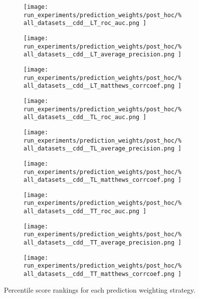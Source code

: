 \documentclass[conference]{IEEEtran}
\begin{document}
\begin{figure*}
    \centering
    \begin{subfigure}{0.32\textwidth}
        \texttt{[image: 
            run\_experiments/prediction\_weights/post\_hoc/\%
            all\_datasets\_\_cdd\_\_LT\_roc\_auc.png
        ]}
    \end{subfigure}
    \begin{subfigure}{0.32\textwidth}
        \texttt{[image: 
            run\_experiments/prediction\_weights/post\_hoc/\%
            all\_datasets\_\_cdd\_\_LT\_average\_precision.png
        ]}
    \end{subfigure}
    \begin{subfigure}{0.32\textwidth}
        \texttt{[image: 
            run\_experiments/prediction\_weights/post\_hoc/\%
            all\_datasets\_\_cdd\_\_LT\_matthews\_corrcoef.png
        ]}
    \end{subfigure}

    \begin{subfigure}{0.32\textwidth}
        \texttt{[image: 
            run\_experiments/prediction\_weights/post\_hoc/\%
            all\_datasets\_\_cdd\_\_TL\_roc\_auc.png
        ]}
    \end{subfigure}
    \begin{subfigure}{0.32\textwidth}
        \texttt{[image: 
            run\_experiments/prediction\_weights/post\_hoc/\%
            all\_datasets\_\_cdd\_\_TL\_average\_precision.png
        ]}
    \end{subfigure}
    \begin{subfigure}{0.32\textwidth}
        \texttt{[image: 
            run\_experiments/prediction\_weights/post\_hoc/\%
            all\_datasets\_\_cdd\_\_TL\_matthews\_corrcoef.png
        ]}
    \end{subfigure}

    \begin{subfigure}{0.32\textwidth}
        \texttt{[image: 
            run\_experiments/prediction\_weights/post\_hoc/\%
            all\_datasets\_\_cdd\_\_TT\_roc\_auc.png
        ]}
    \end{subfigure}
    \begin{subfigure}{0.32\textwidth}
        \texttt{[image: 
            run\_experiments/prediction\_weights/post\_hoc/\%
            all\_datasets\_\_cdd\_\_TT\_average\_precision.png
        ]}
    \end{subfigure}
    \begin{subfigure}{0.32\textwidth}
        \texttt{[image: 
            run\_experiments/prediction\_weights/post\_hoc/\%
            all\_datasets\_\_cdd\_\_TT\_matthews\_corrcoef.png
        ]}
    \end{subfigure}
    \caption{Percentile score rankings for each prediction weighting strategy.}
    \label{fig:pred_weights}
\end{figure*}
\end{document}
